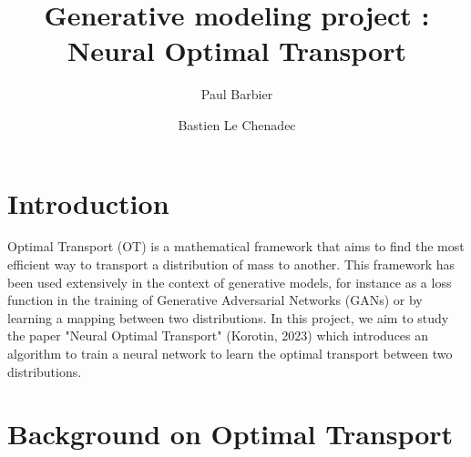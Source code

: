 \documentclass[11pt]{article}
\title{Generative modeling project : Neural Optimal Transport}
\author[1]{Paul Barbier}
\author[1]{Bastien Le Chenadec}
\affil[1]{École des Ponts ParisTech, Master MVA}
\begin{document}
\maketitle

\begin{contribstatement}
\end{contribstatement}

\section{Introduction}

Optimal Transport (OT) is a mathematical framework that aims to find the most efficient way to transport a distribution of mass to another. This framework has been used extensively in the context of generative models, for instance as a loss function in the training of Generative Adversarial Networks (GANs) or by learning a mapping between two distributions. In this project, we aim to study the paper "Neural Optimal Transport" (Korotin, 2023) \cite{korotin-2022} which introduces an algorithm to train a neural network to learn the optimal transport between two distributions.

\section{Background on Optimal Transport}
\end{document}
